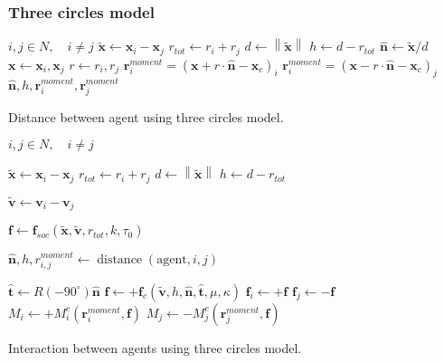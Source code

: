 \documentclass[]{article}
\begin{document}
\subsubsection{Three circles model}
\begin{algorithm}[H]
\begin{algorithmic}[1]
\REQUIRE $ i,j \in N, \quad i \neq j $
\ENSURE
{}
\STATE $ \tilde{\mathbf{x}} \gets \mathbf{x}_{i} - \mathbf{x}_{j} $
\STATE $ r_{tot} \gets r_{i} + r_{j} $ 
\STATE $ d \gets \left\|\tilde{\mathbf{x}}\right\| $
\STATE $ h \gets d - r_{tot} $
\STATE $ \hat{\mathbf{n}} \gets \tilde{\mathbf{x}} / d $
\STATE $ \mathbf{x} \gets \mathbf{x}_{i}, \mathbf{x}_{j} $
\STATE $ r \gets r_{i}, r_{j} $
\ENDIF
\ENDFOR
\ENDFOR
\STATE $ \mathbf{r}_{i}^{moment} = (\mathbf{x} + r \cdot \hat{\mathbf{n}} - \mathbf{x}_{c})_{i}  $
\STATE $ \mathbf{r}_{i}^{moment} = (\mathbf{x} - r \cdot \hat{\mathbf{n}} - \mathbf{x}_{c})_{j}  $
\RETURN $ \hat{\mathbf{n}}, h, \mathbf{r}_{i}^{moment}, \mathbf{r}_{j}^{moment} $
\end{algorithmic}
\caption{Distance between agent using three circles model.}
\end{algorithm}


\begin{algorithm}[H]
\begin{algorithmic}[1]
\REQUIRE $ i,j \in N, \quad i \neq j $
\ENSURE

\STATE $ \tilde{\mathbf{x}} \gets \mathbf{x}_{i} - \mathbf{x}_{j} $
\STATE $ r_{tot} \gets r_{i} + r_{j} $ 
\STATE $ d \gets \left\|\tilde{\mathbf{x}}\right\| $
\STATE $ h \gets d - r_{tot} $
\STATE 

\STATE $ \tilde{\mathbf{v}} \gets \mathbf{v}_{i} - \mathbf{v}_{j} $

\STATE $ \mathbf{f} \gets \mathbf{f}_{soc}(\tilde{\mathbf{x}}, \tilde{\mathbf{v}}, r_{tot}, k, \tau_{0}) $

\STATE $ \hat{\mathbf{n}}, h, r_{i,j}^{moment} \gets \operatorname{distance}(\mathrm{agent}, i, j) $

\STATE $ \hat{\mathbf{t}} \gets R(-90^{\circ}) \hat{\mathbf{n}} $
\STATE $ \mathbf{f} \gets +\mathbf{f}_{c}(\tilde{\mathbf{v}}, h, \hat{\mathbf{n}}, \hat{\mathbf{t}}, \mu, \kappa) $
\ENDIF
\STATE $ \mathbf{f}_{i} \gets +\mathbf{f} $
\STATE $ \mathbf{f}_{j} \gets -\mathbf{f} $
\STATE $ M_{i} \gets +M_{i}^{c}(\mathbf{r}_{i}^{moment}, \mathbf{f}) $
\STATE $ M_{j} \gets -M_{j}^{c}(\mathbf{r}_{j}^{moment}, \mathbf{f}) $
\ENDIF

\ENDIF
\end{algorithmic}
\caption{Interaction between agents using three circles model.}
\end{algorithm}
\end{document}
